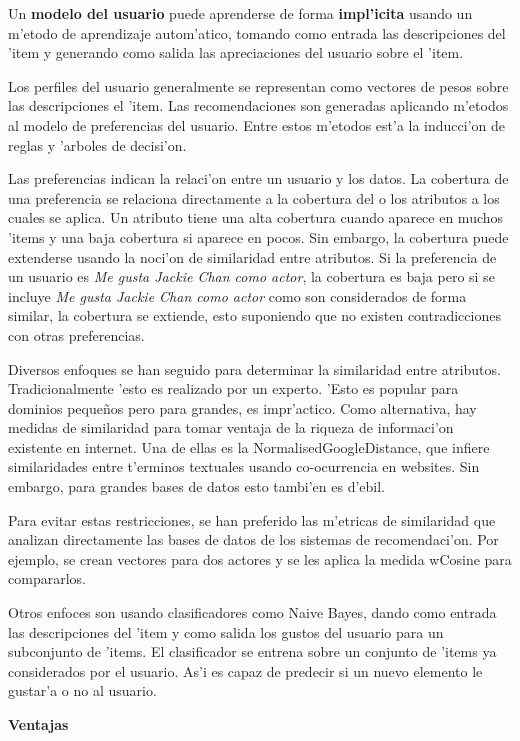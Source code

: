 \documentclass[11pt]{article}
\begin{document}
Un \textbf{modelo del usuario} puede aprenderse de forma \textbf{impl'icita} usando un m'etodo de aprendizaje autom'atico, tomando como entrada las descripciones del 'item y generando como salida las apreciaciones del usuario sobre el 'item.

Los perfiles del usuario generalmente se representan como vectores de pesos sobre las descripciones el 'item. Las recomendaciones son generadas aplicando m'etodos al modelo de preferencias del usuario. Entre estos m'etodos est'a la inducci'on de reglas y 'arboles de decisi'on.

Las preferencias indican la relaci'on entre un usuario y los datos. La cobertura de una preferencia se relaciona directamente a la cobertura del o los atributos a los cuales se aplica. Un atributo tiene una alta cobertura cuando aparece en muchos 'items y una baja cobertura si aparece en pocos. Sin embargo, la cobertura puede extenderse usando la noci'on de similaridad entre atributos. Si la preferencia de un usuario es \textit{Me gusta Jackie Chan como actor}, la cobertura es baja pero si se incluye \textit{Me gusta Jackie Chan como actor} como son considerados de forma similar, la cobertura se extiende, esto suponiendo que no existen contradicciones con otras preferencias.

 Diversos enfoques se han seguido para determinar la similaridad entre atributos. Tradicionalmente 'esto es realizado por un experto. 'Esto es popular para dominios peque\~{n}os pero para grandes, es impr'actico. Como alternativa, hay medidas de similaridad para tomar ventaja de la riqueza de informaci'on existente en internet. Una de ellas es la NormalisedGoogleDistance, que infiere similaridades entre t'erminos textuales usando co-ocurrencia en websites. Sin embargo, para grandes bases de datos esto tambi'en es d'ebil.

Para evitar estas restricciones, se han preferido las m'etricas de similaridad que analizan directamente las bases de datos de los sistemas de recomendaci'on. Por ejemplo, se crean vectores para dos actores y se les aplica la medida wCosine para compararlos.

Otros enfoces son usando clasificadores como Naive Bayes, dando como entrada las descripciones del 'item y como salida los gustos del usuario para un subconjunto de 'items. El clasificador se entrena sobre un conjunto de 'items ya considerados por el usuario. As'i es capaz de predecir si un nuevo elemento le gustar'a o no al usuario.

\medskip
\noindent
\textbf{Ventajas}
\end{document}
